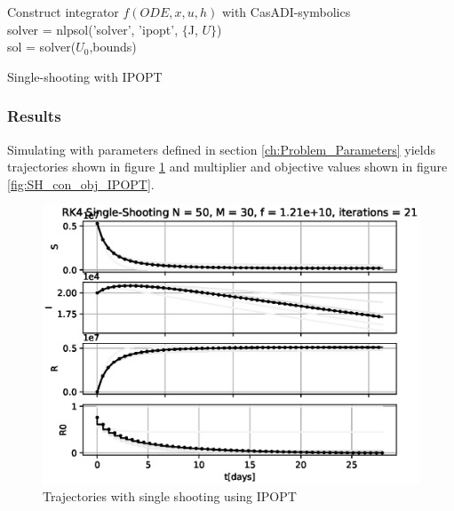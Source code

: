 \begin{algorithm}[H]
\SetAlgoLined
{}
Construct integrator $f(ODE, x, u, h)$ with CasADI-symbolics\\
 solver = nlpsol('solver', 'ipopt', $\{$J, $U\}$)\\
 sol = solver($U_0$,bounds)
 \caption{Single-shooting with IPOPT}
 \label{alg:SingleShooting_Integration_IPOPT}
\end{algorithm}
\subsubsection{Results}
Simulating with parameters defined in section \ref{ch:Problem_Parameters} yields trajectories shown in figure \ref{fig:SH_Traj_IPOPT} and multiplier and objective values shown in figure \ref{fig:SH_con_obj_IPOPT}.

\begin{figure}[H]
    \centering
    \includegraphics[width=.8\textwidth]{pythonProject/Figures/Single_Shooting_Trajectory_IPOPT.eps}
    \caption{Trajectories with single shooting using IPOPT}
    \label{fig:SH_Traj_IPOPT}
\end{figure}

